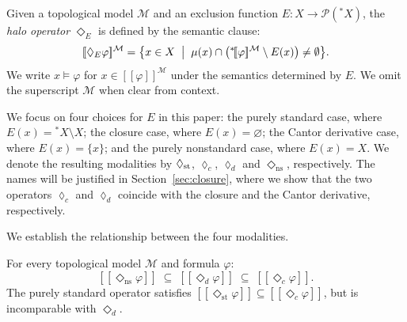 \documentclass[submission,copyright,creativecommons]{eptcs}
\newcommand{\sem}[1]{[\![#1]\!]}
\newcommand{\diam}{\Diamond}
\newcommand{\str}{{{}^{*}\!}}
\newcommand{\lozengens}{\diam_\mathrm{ns}}
\begin{document}
\begin{definition}
\label{def:excl}
Given a topological model $\mathcal{M}$ and an exclusion function $E:X\to\mathcal{P}(\str X)$, the \emph{halo
operator} $\diam_E$ is defined by the semantic clause:
\[
  \sem{\diam_E\varphi}^{\mathcal{M}}
  = \bigl\{x \in X \;\bigm|\;
    \mu(x) \cap \bigl(\str \sem{\varphi}^{\mathcal{M}} \setminus E(x)\bigr)
    \neq \emptyset \bigr\}.
\]
We write $x \models \varphi$ for $x \in \sem{\varphi}^{\mathcal{M}}$ under the semantics determined by $E$.
We omit the superscript $\mathcal{M}$ when clear from context.
\end{definition}

We focus on four choices for $E$ in this paper: the purely standard case, where $E(x)=\str X\setminus X$; the closure case, where $E(x)=\varnothing$; the Cantor derivative case, where $E(x)=\{x\}$; and the purely nonstandard case, where $E(x)=X$.
We denote the resulting modalities by $\lozenge_{\rm st}$, $\lozenge_c$, $\lozenge_d$ and $\lozengens$, respectively.
The names will be justified in Section~\ref{sec:closure}, where we show that the two operators $\lozenge_c$ and $\lozenge_d$ coincide with the closure and the Cantor derivative, respectively.


We establish the relationship between the four modalities.
\begin{proposition}
\label{prop:order}
For every topological model $\mathcal{M}$ and formula $\varphi$:
\[
  \sem{\lozengens\varphi}
  \;\subseteq\;
  \sem{\diam_d\varphi}
  \;\subseteq\;
  \sem{\diam_c\varphi}.
\]
The purely standard operator satisfies $\sem{\diam_\mathrm{st}\varphi} \subseteq
\sem{\diam_c\varphi}$, but is incomparable with $\diam_d$.
\end{proposition}
\end{document}
